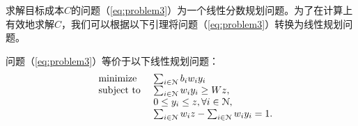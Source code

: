 	
	
	求解目标成本$C$的问题（\ref{eq:problem3}）为一个线性分数规划问题。为了在计算上有效地求解$C$，我们可以根据以下引理将问题（\ref{eq:problem3}）转换为线性规划问题。
	
	\begin{lm}\label{lm:lp}
		问题（\ref{eq:problem3}）等价于以下线性规划问题：
		\begin{equation}
		\hspace{-0.0cm}
		\begin{array}
		[c]{lll}%
		&{\text{minimize}}&~\sum_{i\in\N}b_iw_iy_i
		\\
		&\text{subject to}&~ \sum_{i\in\N}w_iy_i\ge Wz,\\
		&&~ 0\le y_i\le z, \forall i\in\N,\\
		&&~ \sum_{i\in\N}w_iz-\sum_{i\in\N}w_iy_i=1.
		\end{array}
		\label{eq:lp}
		\end{equation}
	\end{lm} 
